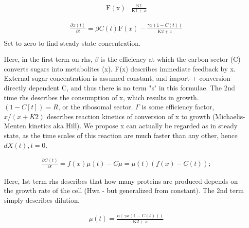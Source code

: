 \begin{align}
\text{F}(\text{x})\text{=}\frac{\text{K1}}{\text{K1}+x}
\end{align}

\begin{align}
\frac{\partial x(t)}{\partial t}=\beta  C(t) \text{F}(x)-\frac{\gamma  x \left(1-C(t)\right)}{\text{K2}+x} \\
\end{align}
Set to zero to find steady state concentration.

Here, in the first term on rhs, $\beta$ is the efficiency at which the carbon sector (C) converts sugars into metabolites (x). F(x) describes immediate feedback by x. External sugar concentration is assumed constant, and import + conversion directly dependent C, and thus there is no term "s" in this formulae.
The 2nd time rhs describes the consumption of x, which results in growth. $(1-C[t]) = R$, or the ribosomal sector. $\Gamma$ is some efficiency factor, $x/(x+K2)$ describes reaction kinetics of conversion of x to growth (Michaelis-Menten kinetics aka Hill). 
We propose x can actually be regarded as in steady state, as the time scales of this reaction are much faster than any other, hence $dX(t),t = 0$. 

\begin{align}
\frac{\partial C(t)}{\partial t}=f(x) \mu (t)-C \mu =\mu (t) \left(f(x)-C(t)\right);
\end{align}

Here, 1st term rhs describes that how many proteins are produced depends on the growth rate of the cell (Hwa - but generalized from constant). The 2nd term simply describes dilution.

\begin{align}
\mu (t)=\frac{\alpha  \left(\gamma  x \left(1-C(t)\right)\right)}{\text{K2}+x}
\end{align}




%
